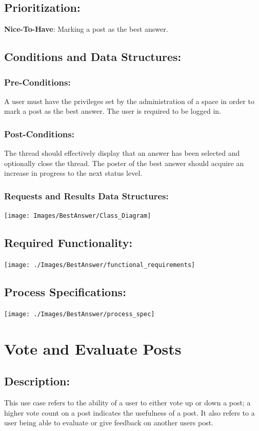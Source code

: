 \documentclass[a4paper,11pt]{article}
\begin{document}
\subsection{Prioritization:} 
\textbf{Nice-To-Have}: Marking a post as the best answer.
\subsection{Conditions and Data Structures:}
\subsubsection*{Pre-Conditions:}
A user must have the privileges set by the administration of a space in order to mark a post as the best answer. The user is required to be logged in.
\subsubsection*{Post-Conditions:}
The thread should effectively display that an answer has been selected and optionally close the thread. The poster of the best answer should acquire an increase in progress to the next status level.
\subsubsection*{Requests and Results Data Structures:}
\texttt{[image: Images/BestAnswer/Class\_Diagram]}
\subsection{Required Functionality:} 
\begin{center}
\texttt{[image: ./Images/BestAnswer/functional\_requirements]}
\end{center}
\subsection{Process Specifications:} 
\begin{center}
\texttt{[image: ./Images/BestAnswer/process\_spec]}
\end{center}

\section{Vote and Evaluate Posts}
\subsection*{Description:}
This use case refers to the ability of a user to either vote up or down a post; a higher vote count on a post indicates the usefulness of a post. It also refers to a user being able to evaluate or give feedback on another users post.
\end{document}
